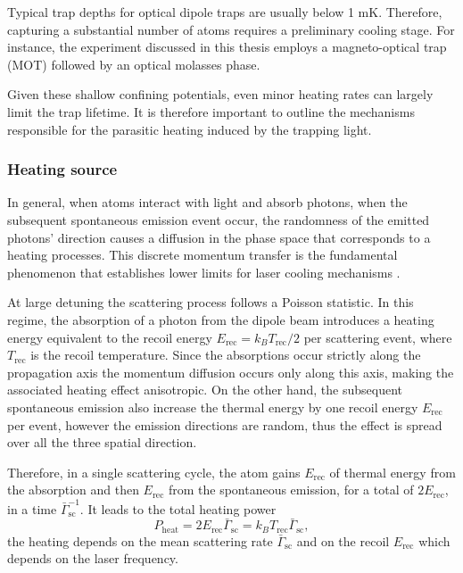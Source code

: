 Typical trap depths for optical dipole traps are usually below 1 mK. Therefore, capturing a substantial number of atoms requires a preliminary cooling stage. For instance, the experiment discussed in this thesis employs a magneto-optical trap (MOT) followed by an optical molasses phase.

Given these shallow confining potentials, even minor heating rates can largely limit the trap lifetime. It is therefore important to outline the mechanisms responsible for the parasitic heating induced by the trapping light.

\subsubsection{Heating source}
In general, when atoms interact with light and absorb photons, when the subsequent spontaneous emission event occur, the randomness of the emitted photons' direction causes a diffusion in the phase space that corresponds to a heating processes. This discrete momentum transfer is the fundamental phenomenon that establishes lower limits for laser cooling mechanisms \cite{CohenLesHouches, metcalf1999}.

At large detuning the scattering process follows a Poisson statistic. In this regime, the absorption of a photon from the dipole beam introduces a heating energy equivalent to the recoil energy $E_\text{rec} = k_B T_\text{rec}/2$ per scattering event, where $T_\text{rec}$ is the recoil temperature. Since the absorptions occur strictly along the propagation axis the momentum diffusion occurs only along this axis, making the associated heating effect anisotropic. On the other hand, the subsequent spontaneous emission also increase the thermal energy by one recoil energy $E_\text{rec}$ per event, however the emission directions are random, thus the effect is spread over all the three spatial direction.

Therefore, in a single scattering cycle, the atom gains $E_\text{rec}$ of thermal energy from the absorption and then $E_\text{rec}$ from the spontaneous emission, for a total of $2E_\text{rec}$, in a time $\bar{\Gamma}_\text{sc}^{-1}$. It leads to the total heating power
\begin{equation}
    \label{eq:heating_power}
    P_{\text{heat}} = 2 E_{\text{rec}} \bar{\Gamma}_{\text{sc}} = k_B T_{\text{rec}} \bar{\Gamma}_{\text{sc}},
\end{equation}
the heating depends on the mean scattering rate $\bar{\Gamma}_\text{sc}$ and on the recoil $E_\text{rec}$ which depends on the laser frequency.

